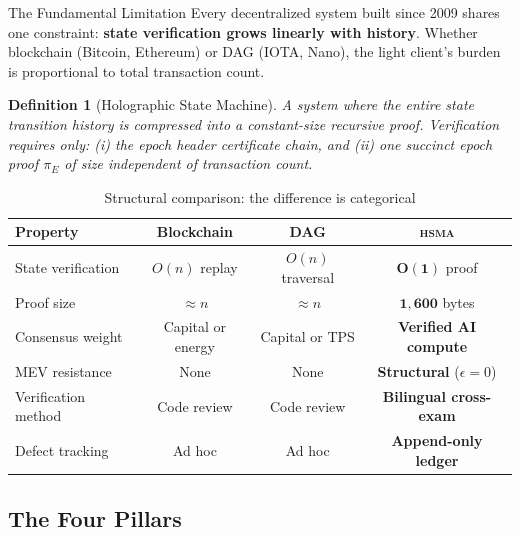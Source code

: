 \documentclass[11pt, a4paper]{article}
\newtheorem{definition}{Definition}
\newcommand{\hsma}{\textsc{hsma}}
\begin{document}
\begin{keybox}{The Fundamental Limitation}
Every decentralized system built since 2009 shares one constraint:
\textbf{state verification grows linearly with history}. Whether
blockchain (Bitcoin, Ethereum) or DAG (IOTA, Nano), the light client's
burden is proportional to total transaction count.
\end{keybox}

\begin{definition}[Holographic State Machine]
\label{def:holographic}
A system where the entire state transition history is compressed into
a \emph{constant-size recursive proof}. Verification requires only:
(i) the epoch header certificate chain, and (ii) one succinct epoch
proof $\pi_E$ of size independent of transaction count.
\end{definition}

\begin{table}[h]
\centering
{}
\begin{tabular}{lccc}
\toprule
\rowcolor{hsmaBlue!20} \textbf{Property} & \textbf{Blockchain} & \textbf{DAG} & \color{hsmaBlue}\textbf{\hsma{}} \\
\midrule
State verification & $O(n)$ replay & $O(n)$ traversal & $\mathbf{O(1)}$ proof \\
Proof size & $\approx n$ & $\approx n$ & $\mathbf{1{,}600}$ bytes \\
Consensus weight & Capital or energy & Capital or TPS & \textbf{Verified AI compute} \\
MEV resistance & None & None & \textbf{Structural} ($\epsilon{=}0$) \\
Verification method & Code review & Code review & \textbf{Bilingual cross-exam} \\
Defect tracking & Ad hoc & Ad hoc & \textbf{Append-only ledger} \\
\bottomrule
\end{tabular}
\caption{Structural comparison: the difference is categorical}
\end{table}

\subsection{The Four Pillars}
\end{document}
